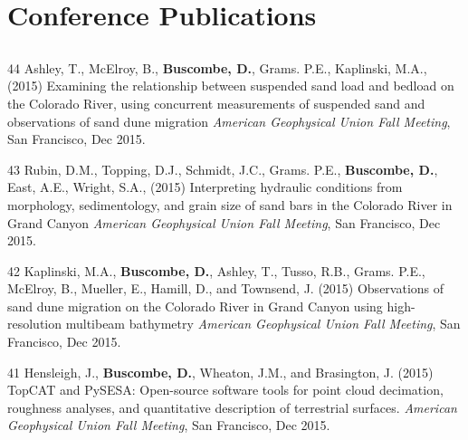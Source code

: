\documentclass[margin,line]{resume}
\begin{document}
\begin{resume}
\begin{footnotesize}
        \end{footnotesize}

    \section{\mysidestyle Conference Publications}

        \begin{footnotesize}
        
	\subsection{}
	\begin{list1}	

        \item[44] Ashley, T., McElroy, B., {\bf Buscombe, D.}, Grams. P.E., Kaplinski, M.A., (2015) Examining the relationship between suspended sand load and bedload on the Colorado River, using concurrent measurements of suspended sand and observations of sand dune migration {\sl American Geophysical Union Fall Meeting}, San Francisco, Dec 2015.\\

        \item[43] Rubin, D.M., Topping, D.J., Schmidt, J.C., Grams. P.E., {\bf Buscombe, D.}, East, A.E., Wright, S.A., (2015) Interpreting hydraulic conditions from morphology, sedimentology, and grain size of sand bars in the Colorado River in Grand Canyon {\sl American Geophysical Union Fall Meeting}, San Francisco, Dec 2015.\\
        
        \item[42] Kaplinski, M.A., {\bf Buscombe, D.}, Ashley, T., Tusso, R.B., Grams. P.E., McElroy, B., Mueller, E., Hamill, D., and Townsend, J. (2015) Observations of sand dune migration on the Colorado River in Grand Canyon using high-resolution multibeam bathymetry {\sl American Geophysical Union Fall Meeting}, San Francisco, Dec 2015.\\

        \item[41] Hensleigh, J., {\bf Buscombe, D.}, Wheaton, J.M., and Brasington, J. (2015) TopCAT and PySESA: Open-source software tools for point cloud decimation, roughness analyses, and quantitative description of terrestrial surfaces. {\sl American Geophysical Union Fall Meeting}, San Francisco, Dec 2015.\\  
        

\end{list1}
\end{footnotesize}
\end{resume}
\end{document}
